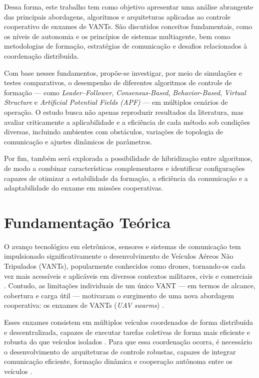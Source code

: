 \documentclass[portuguese]{sbcreviews-2025}%
\begin{document}
Dessa forma, este trabalho tem como objetivo apresentar uma análise abrangente das principais abordagens, algoritmos e arquiteturas aplicadas ao controle cooperativo de enxames de VANTs. São discutidos conceitos fundamentais, como os níveis de autonomia e os princípios de sistemas multiagente, bem como metodologias de formação, estratégias de comunicação e desafios relacionados à coordenação distribuída. 

Com base nesses fundamentos, propõe-se investigar, por meio de simulações e testes comparativos, o desempenho de diferentes algoritmos de controle de formação — como \textit{Leader–Follower}, \textit{Consensus-Based}, \textit{Behavior-Based}, \textit{Virtual Structure} e \textit{Artificial Potential Fields (APF)} — em múltiplos cenários de operação. O estudo busca não apenas reproduzir resultados da literatura, mas avaliar criticamente a aplicabilidade e a eficiência de cada método sob condições diversas, incluindo ambientes com obstáculos, variações de topologia de comunicação e ajustes dinâmicos de parâmetros.

Por fim, também será explorada a possibilidade de hibridização entre algoritmos, de modo a combinar características complementares e identificar configurações capazes de otimizar a estabilidade da formação, a eficiência da comunicação e a adaptabilidade do enxame em missões cooperativas.



\section{Fundamentação Teórica}

O avanço tecnológico em eletrônicos, sensores e sistemas de comunicação tem impulsionado significativamente o desenvolvimento de Veículos Aéreos Não Tripulados (VANTs), popularmente conhecidos como drones, tornando-os cada vez mais acessíveis e aplicáveis em diversos contextos militares, civis e comerciais \cite{khan2017fanet}. Contudo, as limitações individuais de um único VANT — em termos de alcance, cobertura e carga útil — motivaram o surgimento de uma nova abordagem cooperativa: os enxames de VANTs (\textit{UAV swarms}) \cite{bu2024advancement, chung2018survey}.

Esses enxames consistem em múltiplos veículos coordenados de forma distribuída e descentralizada, capazes de executar tarefas coletivas de forma mais eficiente e robusta do que veículos isolados \cite{hong2020swarm}. Para que essa coordenação ocorra, é necessário o desenvolvimento de arquiteturas de controle robustas, capazes de integrar comunicação eficiente, formação dinâmica e cooperação autônoma entre os veículos \cite{hong2020swarm}.
\end{document}
